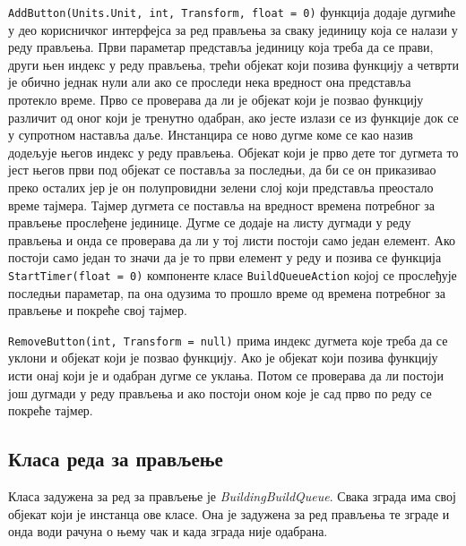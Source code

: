 \documentclass[11pt,a4paper]{article}
\begin{document}
\texttt{AddButton(Units.Unit, int, Transform, float = 0)} функција додаје дугмиће у део корисничког интерфејса за ред прављења за сваку јединицу која се налази у реду прављења. Први параметар представља јединицу која треба да се прави, други њен индекс у реду прављења, трећи објекат који позива функцију а четврти је обично једнак нули али ако се проследи нека вредност она представља протекло време. Прво се проверава да ли је објекат који је позвао функцију различит од оног који је тренутно одабран, ако јесте излази се из функције док се у супротном наставља даље. Инстанцира се ново дугме коме се као назив додељује његов индекс у реду прављења. Објекат који је прво дете тог дугмета то јест његов први под објекат се поставља за последњи, да би се он приказивао преко осталих јер је он полупровидни зелени слој који представља преостало време тајмера. Тајмер дугмета се поставља на вредност времена потребног за прављење прослеђене јединице. Дугме се додаје на листу дугмади у реду прављења и онда се проверава да ли у тој листи постоји само један елемент. Ако постоји само један то значи да је то први елемент у реду и позива се функција \texttt{StartTimer(float = 0)} компоненте класе \texttt{BuildQueueAction} којој се прослеђује последњи параметар, па она одузима то прошло време од времена потребног за прављење и покреће свој тајмер.

\texttt{RemoveButton(int, Transform = null)} прима индекс дугмета које треба да се уклони и објекат који је позвао функцију. Ако је објекат који позива функцију исти онај који је и одабран дугме се уклања. Потом се проверава да ли постоји још дугмади у реду прављења и ако постоји оном које је сад прво по реду се покреће тајмер.

\subsection{Класа реда за прављење}
Класа задужена за ред за прављење је \emph{BuildingBuildQueue}. Свака зграда има свој објекат који је инстанца ове класе. Она је задужена за ред прављења те зграде и онда води рачуна о њему чак и када зграда није одабрана.
\end{document}
